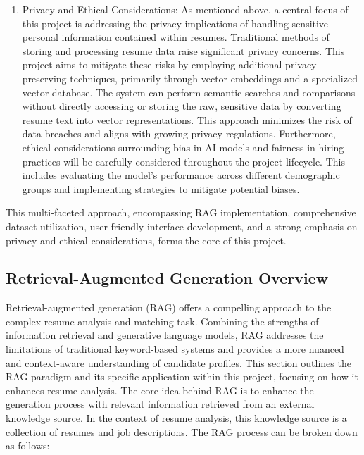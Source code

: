 \documentclass[12pt]{report}
\begin{document}
\begin{enumerate}
    \item Privacy and Ethical Considerations: As mentioned above, a central focus of this project is addressing the privacy implications of handling sensitive personal information contained within resumes. Traditional methods of storing and processing resume data raise significant privacy concerns. This project aims to mitigate these risks by employing additional privacy-preserving techniques, primarily through vector embeddings and a specialized vector database. The system can perform semantic searches and comparisons without directly accessing or storing the raw, sensitive data by converting resume text into vector representations. This approach minimizes the risk of data breaches and aligns with growing privacy regulations. Furthermore, ethical considerations surrounding bias in AI models and fairness in hiring practices will be carefully considered throughout the project lifecycle. This includes evaluating the model's performance across different demographic groups and implementing strategies to mitigate potential biases.

\end{enumerate}
    This multi-faceted approach, encompassing RAG implementation, comprehensive dataset utilization, user-friendly interface development, and a strong emphasis on privacy and ethical considerations, forms the core of this project. 

\subsection{Retrieval-Augmented Generation Overview}
Retrieval-augmented generation (RAG) offers a compelling approach to the complex resume analysis and matching task. Combining the strengths of information retrieval and generative language models, RAG addresses the limitations of traditional keyword-based systems and provides a more nuanced and context-aware understanding of candidate profiles. This section outlines the RAG paradigm and its specific application within this project, focusing on how it enhances resume analysis.
The core idea behind RAG is to enhance the generation process with relevant information retrieved from an external knowledge source. In the context of resume analysis, this knowledge source is a collection of resumes and job descriptions. The RAG process can be broken down as follows:
\end{document}
